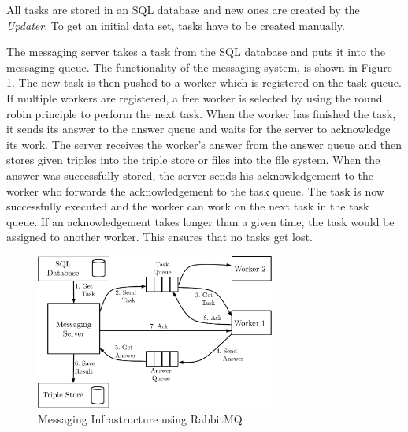 All tasks are stored in an SQL database and new ones are created by the \textit{Updater}.
To get an initial data set, tasks have to be created manually.

The messaging server takes a task from the SQL database and puts it into the messaging queue.
The functionality of the messaging system, is shown in Figure \ref{fig_messaging_infrastructure}.
The new task is then pushed to a worker which is registered on the task queue.
If multiple workers are registered, a free worker is selected by using the round robin principle to perform the next task.
When the worker has finished the task, it sends its answer to the answer queue and waits for the server to acknowledge its work.
The server receives the worker's answer from the answer queue and then stores given triples into the triple store or files into the file system.
When the answer was successfully stored, the server sends his acknowledgement to the worker who forwards the acknowledgement to the task queue.
The task is now successfully executed and the worker can work on the next task in the task queue.
If an acknowledgement takes longer than a given time, the task would be assigned to another worker.
This ensures that no tasks get lost.

\begin{figure}[ht]
  \begin{center}
  \includegraphics[width=0.7\textwidth]{images/rabbit_mq.pdf}
  \end{center}
  \caption{Messaging Infrastructure using RabbitMQ}
  \label{fig_messaging_infrastructure}
\end{figure}